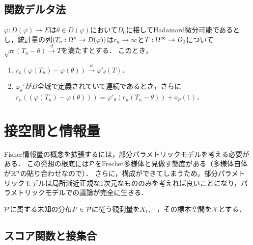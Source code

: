 \documentclass[uplatex,dvipdfmx]{jsreport}
\begin{document}
\begin{proposition}[Hadamard微分の連鎖律]
    
\end{proposition}

\subsection{関数デルタ法}

\begin{theorem}
    $\varphi:D(\varphi)\to E$は$\theta\in D(\varphi)$において$D_0$に接してHadamard微分可能であるとし，統計量の列$(T_n:\Om^n\to D(\varphi))$は$r_n\to\infty$と$T:\Om^\infty\to D_0$について$\sqrt{n}(T_n-\theta)\xrightarrow{d}T$を満たすとする．
    このとき，
    \begin{enumerate}
        \item $r_n(\varphi(T_n)-\varphi(\theta))\xrightarrow{d}\varphi'_\theta(T)$．
        \item $\varphi_\theta'$が$D$全域で定義されていて連続であるとき，さらに$r_n((\varphi(T_n)-\varphi(\theta)))=\varphi'_\theta(r_n(T_n-\theta))+o_P(1)$．
    \end{enumerate}
\end{theorem}

\section{接空間と情報量}

\begin{tcolorbox}[colframe=ForestGreen, colback=ForestGreen!10!white,breakable,colbacktitle=ForestGreen!40!white,coltitle=black,fonttitle=\bfseries\sffamily,
title=]
    Fisher情報量の概念を拡張するには，部分パラメトリックモデルを考える必要がある．
    この発想の根底には$\P$をFrechet多様体と見做す態度がある（多様体自体が$\R^n$の貼り合わせなので）．
    さらに，構成ができてしまうため，部分パラメトリックモデルは局所漸近正規な1次元なもののみを考えれば良いことになり，パラメトリックモデルでの議論が完全に生きる．
\end{tcolorbox}

\begin{notation}
    $\P$に属する未知の分布$P\in\P$に従う観測量を$X_1,\cdots$，その標本空間を$\X$とする．
\end{notation}

\subsection{スコア関数と接集合}
\end{document}
